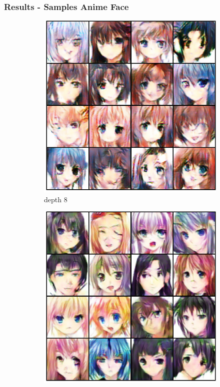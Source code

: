 \begin{frame}
    \frametitle{Results - Samples Anime Face}

    \begin{center}
    
        \begin{figure}[H]
            \centering
            \begin{subfigure}[b]{0.24\textwidth}
                \centering
                \includegraphics[width=\textwidth]{resources/images/output_anime_8.eps}
                \caption{depth 8}
                \label{fig:anime_8}
            \end{subfigure}
            \hfill
            \begin{subfigure}[b]{0.24\textwidth}
                \centering
                \includegraphics[width=\textwidth]{resources/images/output_anime_16.eps}

\end{subfigure}
\end{figure}
\end{center}
\end{frame}
